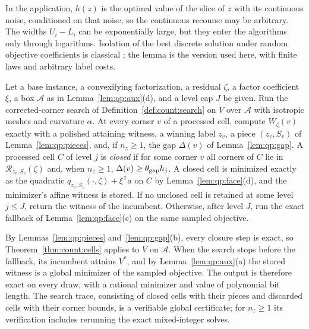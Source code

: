 In the application, $h(z)$ is the optimal value of the slice of $z$ with its
continuous noise, conditioned on that noise, so the continuous recourse may
be arbitrary. The widths $U_i-L_i$ can be exponentially large, but they enter
the algorithms only through logarithms. Isolation of the best discrete
solution under random objective coefficients is classical
\cite{beier2006-typical-properties-of-winners-and,roglin2007-smoothed-analysis-of-integer-programming};
the lemma is the version used here, with finite laws and arbitrary label
costs.

\begin{definition}\label{def:qp:closure-search}
Let a base instance, a convexifying factorization, a residual $\zeta$, a
factor coefficient $\xi$, a box $\mathcal A$ as in Lemma~\ref{lem:qp:aux}(d),
and a level cap $J$ be given. Run the corrected-corner search of
Definition~\ref{def:count:search} on $V$ over $\mathcal A$ with isotropic
meshes and curvature $\alpha$. At every corner $v$ of a processed cell,
compute $W_\zeta(v)$ exactly with a polished attaining witness, a winning
label $z_v$, a piece $(z_v,S_v)$ of Lemma~\ref{lem:qp:pieces}, and, if
$n_z\ge1$, the gap $\Delta(v)$ of Lemma~\ref{lem:qp:gap}. A processed cell
$C$ of level $j$ is \emph{closed} if for some corner $v$ all corners of $C$
lie in $\mathcal R_{z_v,S_v}(\zeta)$ and, when $n_z\ge1$,
$\Delta(v)\ge\theta_{\rm gap}h_j$. A closed cell is minimized exactly as the
quadratic $q_{z_v,S_v}(\cdot,\zeta)+\xi^{\mathsf T} a$ on $C$ by
Lemma~\ref{lem:qp:face}(d), and the minimizer's affine witness is stored. If
no unclosed cell is retained at some level $j\le J$, return the witness of the
incumbent. Otherwise, after level $J$, run the exact fallback of
Lemma~\ref{lem:qp:face}(c) on the same sampled objective.
\end{definition}

By Lemmas~\ref{lem:qp:pieces} and~\ref{lem:qp:gap}(b), every closure step is
exact, so Theorem~\ref{thm:count:cells} applies to $V$ on $\mathcal A$. When
the search stops before the fallback, its incumbent attains $V^*$, and by
Lemma~\ref{lem:qp:aux}(a) the stored witness is a global minimizer of the
sampled objective. The output is therefore exact on every draw, with a
rational minimizer and value of polynomial bit length. The search trace,
consisting of closed cells with their pieces and discarded cells with their
corner bounds, is a verifiable global certificate; for $n_z\ge1$ its
verification includes rerunning the exact mixed-integer solves.

